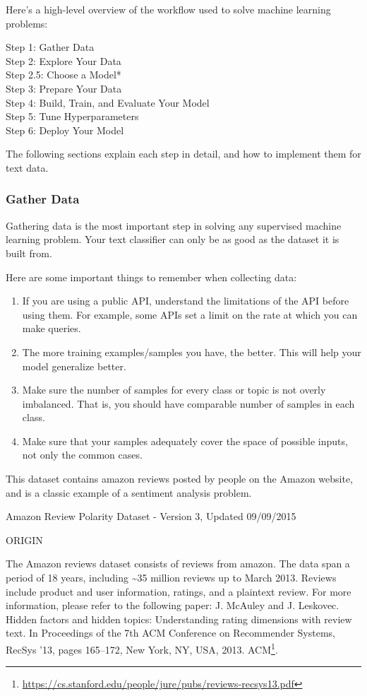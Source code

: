 \documentclass[
]{article}
\DeclareRobustCommand{\href}[2]{#2\footnote{\url{#1}}}
\begin{document}
Here's a high-level overview of the workflow used to solve machine
learning problems:

Step 1: Gather Data\\
Step 2: Explore Your Data\\
Step 2.5: Choose a Model*\\
Step 3: Prepare Your Data\\
Step 4: Build, Train, and Evaluate Your Model\\
Step 5: Tune Hyperparameters\\
Step 6: Deploy Your Model

The following sections explain each step in detail, and how to implement
them for text data.

\hypertarget{gather-data}{%
\subsubsection{Gather Data}\label{gather-data}}

Gathering data is the most important step in solving any supervised
machine learning problem. Your text classifier can only be as good as
the dataset it is built from.

Here are some important things to remember when collecting data:

\begin{enumerate}
\def\labelenumi{\arabic{enumi}.}
\item
  If you are using a public API, understand the limitations of the API
  before using them. For example, some APIs set a limit on the rate at
  which you can make queries.
\item
  The more training examples/samples you have, the better. This will
  help your model generalize better.
\item
  Make sure the number of samples for every class or topic is not overly
  imbalanced. That is, you should have comparable number of samples in
  each class.
\item
  Make sure that your samples adequately cover the space of possible
  inputs, not only the common cases.
\end{enumerate}

This dataset contains amazon reviews posted by people on the Amazon
website, and is a classic example of a sentiment analysis problem.

Amazon Review Polarity Dataset - Version 3, Updated 09/09/2015

ORIGIN

The Amazon reviews dataset consists of reviews from amazon. The data
span a period of 18 years, including \textasciitilde35 million reviews
up to March 2013. Reviews include product and user information, ratings,
and a plaintext review. For more information, please refer to the
following paper:
\href{https://cs.stanford.edu/people/jure/pubs/reviews-recsys13.pdf}{J.
McAuley and J. Leskovec. Hidden factors and hidden topics: Understanding
rating dimensions with review text. In Proceedings of the 7th ACM
Conference on Recommender Systems, RecSys '13, pages 165--172, New York,
NY, USA, 2013. ACM}.
\end{document}

